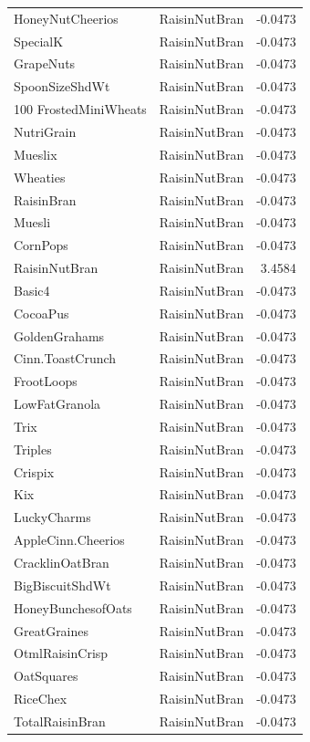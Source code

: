 \begin{longtable}{llr}
HoneyNutCheerios & RaisinNutBran & -0.0473 \\
SpecialK & RaisinNutBran & -0.0473 \\
GrapeNuts & RaisinNutBran & -0.0473 \\
SpoonSizeShdWt & RaisinNutBran & -0.0473 \\
100%
FrostedMiniWheats & RaisinNutBran & -0.0473 \\
NutriGrain & RaisinNutBran & -0.0473 \\
Mueslix & RaisinNutBran & -0.0473 \\
Wheaties & RaisinNutBran & -0.0473 \\
RaisinBran & RaisinNutBran & -0.0473 \\
Muesli & RaisinNutBran & -0.0473 \\
CornPops & RaisinNutBran & -0.0473 \\
RaisinNutBran & RaisinNutBran & 3.4584 \\
Basic4 & RaisinNutBran & -0.0473 \\
CocoaPus & RaisinNutBran & -0.0473 \\
GoldenGrahams & RaisinNutBran & -0.0473 \\
Cinn.ToastCrunch & RaisinNutBran & -0.0473 \\
FrootLoops & RaisinNutBran & -0.0473 \\
LowFatGranola & RaisinNutBran & -0.0473 \\
Trix & RaisinNutBran & -0.0473 \\
Triples & RaisinNutBran & -0.0473 \\
Crispix & RaisinNutBran & -0.0473 \\
Kix & RaisinNutBran & -0.0473 \\
LuckyCharms & RaisinNutBran & -0.0473 \\
AppleCinn.Cheerios & RaisinNutBran & -0.0473 \\
CracklinOatBran & RaisinNutBran & -0.0473 \\
BigBiscuitShdWt & RaisinNutBran & -0.0473 \\
HoneyBunchesofOats & RaisinNutBran & -0.0473 \\
GreatGraines & RaisinNutBran & -0.0473 \\
OtmlRaisinCrisp & RaisinNutBran & -0.0473 \\
OatSquares & RaisinNutBran & -0.0473 \\
RiceChex & RaisinNutBran & -0.0473 \\
TotalRaisinBran & RaisinNutBran & -0.0473 \\

\end{longtable}
